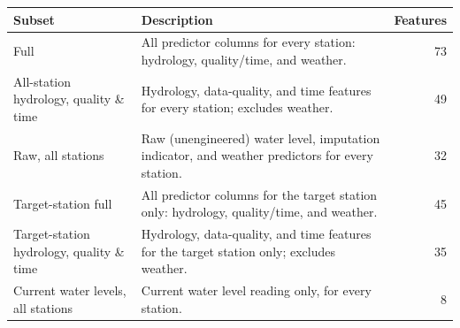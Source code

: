 \begin{tabularx}{\textwidth}{@{}lXr@{}}
\toprule
\textbf{Subset} & \textbf{Description} & \textbf{Features} \\
\midrule
Full & All predictor columns for every station: hydrology, quality/time, and weather. & 73 \\
\addlinespace
All-station hydrology, quality \& time & Hydrology, data-quality, and time features for every station; excludes weather. & 49 \\
\addlinespace
Raw, all stations & Raw (unengineered) water level, imputation indicator, and weather predictors for every station. & 32 \\
\addlinespace
Target-station full & All predictor columns for the target station only: hydrology, quality/time, and weather. & 45 \\
\addlinespace
Target-station hydrology, quality \& time & Hydrology, data-quality, and time features for the target station only; excludes weather. & 35 \\
\addlinespace
Current water levels, all stations & Current water level reading only, for every station. & 8 \\
\bottomrule
\end{tabularx}
